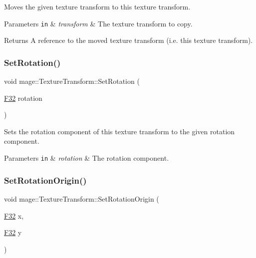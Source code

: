 Moves the given texture transform to this texture transform.


\begin{DoxyParams}[1]{Parameters}
\mbox{\tt in}  & {\em transform} & The texture transform to copy. \\
\hline
\end{DoxyParams}
\begin{DoxyReturn}{Returns}
A reference to the moved texture transform (i.\+e. this texture transform). 
\end{DoxyReturn}
\mbox{\label{classmage_1_1_texture_transform_aadf399acb4be8b747e71224a3e1f723c}} 
\subsubsection{\texorpdfstring{Set\+Rotation()}{SetRotation()}}
{\footnotesize\ttfamily void mage\+::\+Texture\+Transform\+::\+Set\+Rotation (\begin{DoxyParamCaption}\item[{\mbox{\hyperlink{namespacemage_aa97e833b45f06d60a0a9c4fc22ae02c0}{F32}}}]{rotation }\end{DoxyParamCaption})\hspace{0.3cm}{\ttfamily [noexcept]}}

Sets the rotation component of this texture transform to the given rotation component.


\begin{DoxyParams}[1]{Parameters}
\mbox{\tt in}  & {\em rotation} & The rotation component. \\
\hline
\end{DoxyParams}
\mbox{\label{classmage_1_1_texture_transform_a86667569140479a6b7bf6e1987f88c7c}} 
\subsubsection{\texorpdfstring{Set\+Rotation\+Origin()}{SetRotationOrigin()}\hspace{0.1cm}{\footnotesize\ttfamily [1/3]}}
{\footnotesize\ttfamily void mage\+::\+Texture\+Transform\+::\+Set\+Rotation\+Origin (\begin{DoxyParamCaption}\item[{\mbox{\hyperlink{namespacemage_aa97e833b45f06d60a0a9c4fc22ae02c0}{F32}}}]{x,  }\item[{\mbox{\hyperlink{namespacemage_aa97e833b45f06d60a0a9c4fc22ae02c0}{F32}}}]{y }\end{DoxyParamCaption})\hspace{0.3cm}{\ttfamily [noexcept]}}

